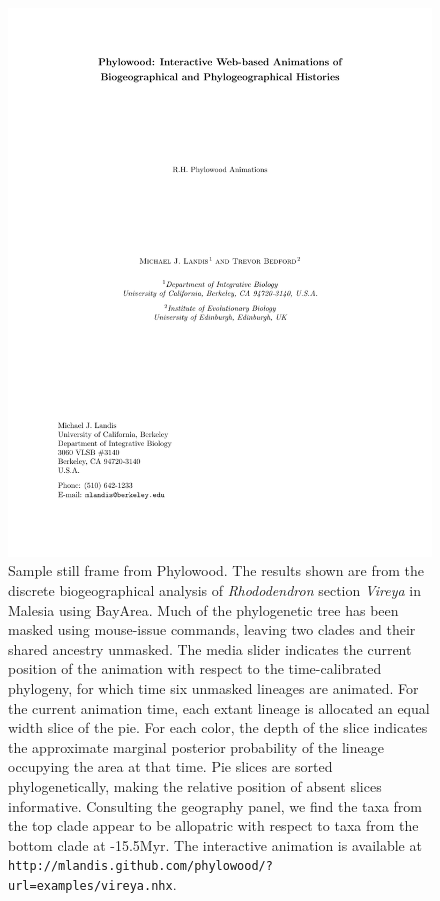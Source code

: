 \documentclass[11pt]{article}
\begin{document}
\begin{figure}
\begin{center}
\includegraphics[width=\textwidth]{phylowood}
\caption{
Sample still frame from Phylowood. The results shown are from the discrete biogeographical analysis of {\it Rhododendron} section {\it Vireya} in Malesia using BayArea. Much of the phylogenetic tree has been masked using mouse-issue commands, leaving two clades and their shared ancestry unmasked. The media slider indicates the current position of the animation with respect to the time-calibrated phylogeny, for which time six unmasked lineages are animated.  For the current animation time, each extant lineage is allocated an equal width slice of the pie. For each color, the depth of the slice indicates the approximate marginal posterior probability of the lineage occupying the area at that time. Pie slices are sorted phylogenetically, making the relative position of absent slices informative. Consulting the geography panel, we find the taxa from the top clade appear to be allopatric with respect to taxa from the bottom clade at -15.5Myr. The interactive animation is available at \texttt{http://mlandis.github.com/phylowood/?url=examples/vireya.nhx}.
}
\label{phylowood}
\end{center}
\end{figure}
\end{document}
